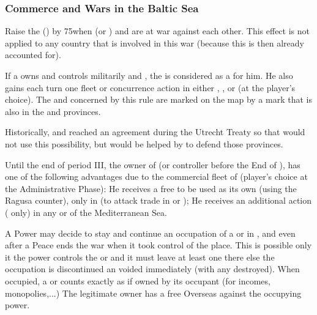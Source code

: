 \subsubsection{Commerce and Wars in the Baltic Sea}
\aparag Raise the  () by
75\ducats when \SUE (or ) and  are at war against
each other.
\aparag This effect is not applied to any country that is involved in this war
(because this is then already accounted for).

\aparag If a \MAJ owns and controls militarily  and
, the  is considered as a \CTZ for him.
\bparag He also gains each turn one fleet or concurrence action in either
, ,  or  (at the player's
choice).  \bparag The \CTZ and \STZ concerned by this rule are marked on the
map by a mark that is also in the  and 
provinces.
\begin{designnote}
  Historically, \SPA and \HOL reached an agreement during the Utrecht Treaty
  so that \SPA would not use this possibility, but would be helped by \HOL to
  defend those provinces.
\end{designnote}


\label{chSpecific:Ragusa}
\aparag Until the end of period III, the owner of  (or
controller before the End of ), has one of the
following advantages due to the commercial fleet of  (player's
choice at the Administrative Phase):
\bparag He receives a free \corsaire\facemoins to be used as its own (using
the Ragusa counter), only in  (to attack trade in
 or );
\bparag He receives an additional action
( only) in any \STZ or \CTZ of the Mediterranean Sea.


\label{chSpecific:Occupation:Caribbean}
\aparag A Power may decide to stay and continue an occupation of a \COL or \TP
in , and even after a Peace ends the war when it took
control of the place. This is possible only it the power controls the \COL or
\TP and it must leave at least one \LD there else the occupation is
discontinued an voided immediately (with any \de destroyed).
\bparag When occupied, a \TP or \COL counts exactly as if owned by its
occupant (for incomes, monopolies,...)
\bparag The legitimate owner has a free Overseas \CB against the occupying
power.


